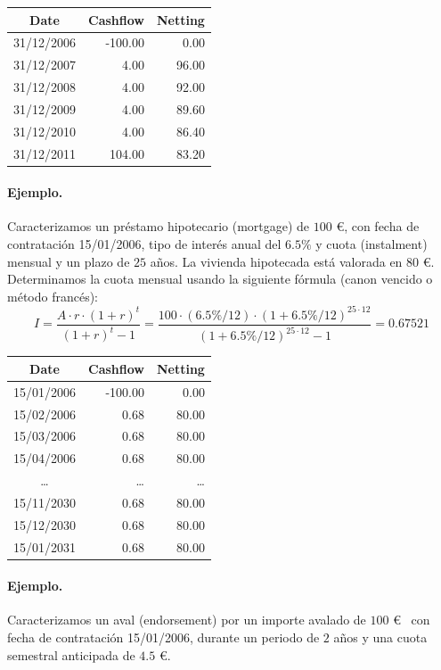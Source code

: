\begin{center}
\begin{tabular}{c|r|r}
\textbf{Date} & \textbf{Cashflow} & \textbf{Netting} \\
\hline
31/12/2006 &  -100.00 &    0.00 \\
31/12/2007 &     4.00 &   96.00 \\
31/12/2008 &     4.00 &   92.00 \\
31/12/2009 &     4.00 &   89.60 \\
31/12/2010 &     4.00 &   86.40 \\
31/12/2011 &   104.00 &   83.20
\end{tabular}
\end{center}

\paragraph{Ejemplo.}
Caracterizamos un pr\'estamo hipotecario (mortgage) de $100$ \euro, con fecha
de contrataci\'on 15/01/2006, tipo de inter\'es anual del $6.5\%$ y cuota
(instalment) mensual y un plazo de $25$ a\~nos. La vivienda hipotecada est\'a
valorada en $80$ \euro. Determinamos la cuota mensual usando la siguiente
f\'ormula (canon vencido o m\'etodo franc\'es):
\begin{displaymath}
I =
\frac{A \cdot r \cdot (1+r)^t}{(1+r)^t - 1} =
\frac{100 \cdot (6.5\%/12) \cdot (1+6.5\%/12)^{25\cdot12}}{(1+6.5\%/12)^{25\cdot12} - 1} =
0.67521
\end{displaymath}

\begin{center}
\begin{tabular}{c|r|r}
\textbf{Date} & \textbf{Cashflow} & \textbf{Netting} \\
\hline
15/01/2006 &  -100.00 &    0.00 \\
15/02/2006 &     0.68 &   80.00 \\
15/03/2006 &     0.68 &   80.00 \\
15/04/2006 &     0.68 &   80.00 \\
\dots      &    \dots &   \dots \\
15/11/2030 &     0.68 &   80.00 \\
15/12/2030 &     0.68 &   80.00 \\
15/01/2031 &     0.68 &   80.00
\end{tabular}
\end{center}

\paragraph{Ejemplo.}
Caracterizamos un aval (endorsement) por un importe avalado de $100$ \euro~
con fecha de contrataci\'on 15/01/2006, durante un periodo de $2$ a\~nos y
una cuota semestral anticipada de $4.5$ \euro.

